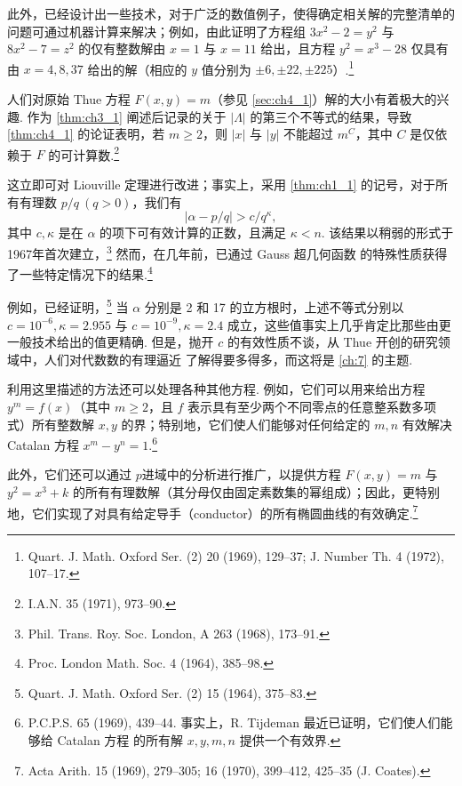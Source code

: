 此外，已经设计出一些技术，对于广泛的数值例子，使得确定相关解的完整清单的问题可通过机器计算来解决；例如，由此证明了方程组 $3x^2-2=y^2$ 与 $8x^2-7=z^2$ 的仅有整数解由 $x=1$ 与 $x=11$ 给出，且方程 $y^2=x^3-28$ 仅具有由 $x=4, 8, 37$ 给出的解（相应的 $y$ 值分别为 $\pm 6, \pm 22, \pm 225$）.\footnote{Quart. J. Math. Oxford Ser. (2) 20 (1969), 129--37; J. Number Th. 4 (1972), 107--17.}

人们对原始 Thue 方程 $F(x,y)=m$（参见 \autoref{sec:ch4_1}）解的大小有着极大的兴趣. 作为 \autoref{thm:ch3_1} 阐述后记录的关于 $|\Lambda|$ 的第三个不等式的结果，导致 \autoref{thm:ch4_1} 的论证表明，若 $m \ge 2$，则 $|x|$ 与 $|y|$ 不能超过 $m^C$，其中 $C$ 是仅依赖于 $F$ 的可计算数.\footnote{I.A.N. 35 (1971), 973--90.}

这立即可对 Liouville 定理进行改进；事实上，采用 \autoref{thm:ch1_1} 的记号，对于所有有理数 $p/q \ (q>0)$，我们有
\[
|\alpha - p/q| > c/q^{\kappa},
\]
其中 $c, \kappa$ 是在 $\alpha$ 的项下可有效计算的正数，且满足 $\kappa < n$. 该结果以稍弱的形式于1967年首次建立，\footnote{Phil. Trans. Roy. Soc. London, A 263 (1968), 173--91.} 然而，在几年前，已通过 Gauss 超几何函数 的特殊性质获得了一些特定情况下的结果.\footnote{Proc. London Math. Soc. 4 (1964), 385--98.}

例如，已经证明，\footnote{Quart. J. Math. Oxford Ser. (2) 15 (1964), 375--83.} 当 $\alpha$ 分别是 2 和 17 的立方根时，上述不等式分别以 $c=10^{-6}, \kappa=2.955$ 与 $c=10^{-9}, \kappa=2.4$ 成立，这些值事实上几乎肯定比那些由更一般技术给出的值更精确. 但是，抛开 $c$ 的有效性质不谈，从 Thue 开创的研究领域中，人们对代数数的有理逼近 了解得要多得多，而这将是 \autoref{ch:7} 的主题.

利用这里描述的方法还可以处理各种其他方程. 例如，它们可以用来给出方程 $y^m = f(x)$（其中 $m \ge 2$，且 $f$ 表示具有至少两个不同零点的任意整系数多项式）所有整数解 $x, y$ 的界；特别地，它们使人们能够对任何给定的 $m, n$ 有效解决 Catalan 方程 $x^m - y^n = 1$.\footnote{P.C.P.S. 65 (1969), 439--44. 事实上，R. Tijdeman 最近已证明，它们使人们能够给 Catalan 方程 的所有解 $x, y, m, n$ 提供一个有效界.}

此外，它们还可以通过 $p$进域中的分析进行推广，以提供方程 $F(x,y) = m$ 与 $y^2 = x^3 + k$ 的所有有理数解（其分母仅由固定素数集的幂组成）；因此，更特别地，它们实现了对具有给定导手（conductor）的所有椭圆曲线的有效确定.\footnote{Acta Arith. 15 (1969), 279--305; 16 (1970), 399--412, 425--35 (J. Coates).}